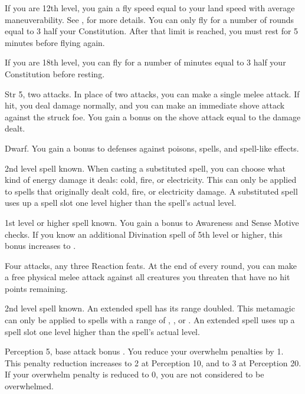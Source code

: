 If you are 12th level, you gain a fly speed equal to your land speed with average maneuverability.
See , for more details.
You can only fly for a number of rounds equal to 3 \add half your Constitution.
After that limit is reached, you must rest for 5 minutes before flying again.

If you are 18th level, you can fly for a number of minutes equal to 3 \add half your Constitution before resting.

\featpres Str 5, two attacks.
\featben In place of two attacks, you can make a single melee attack.
If hit, you deal damage normally, and you can make an immediate shove attack against the struck foe.
You gain a bonus on the shove attack equal to the damage dealt.

\featpre Dwarf.
\featben You gain a  bonus to defenses against poisons, spells, and spell-like effects.

\featpre 2nd level spell known.
\featben When casting a substituted spell, you can choose what kind of energy damage it deals: cold, fire, or electricity.
This can only be applied to spells that originally dealt cold, fire, or electricity damage.
A substituted spell uses up a spell slot one level higher than the spell's actual level.

\featpre 1st level or higher  spell known.
\featben You gain a  bonus to Awareness and Sense Motive checks.
If you know an additional Divination spell of 5th level or higher, this bonus increases to .

\featpres Four attacks, any three Reaction feats.
\featben At the end of every round, you can make a free physical melee attack against all creatures you threaten that have no hit points remaining.

\featpre 2nd level spell known.
\featben An extended spell has its range doubled.
This metamagic can only be applied to spells with a range of \rngclose, \rngmed, or \rnglong.
An extended spell uses up a spell slot one level higher than the spell's actual level.

\featpre Perception 5, base attack bonus .
\featben You reduce your overwhelm penalties by 1.
This penalty reduction increases to 2 at Perception 10, and to 3 at Perception 20.
If your overwhelm penalty is reduced to 0, you are not considered to be overwhelmed.

